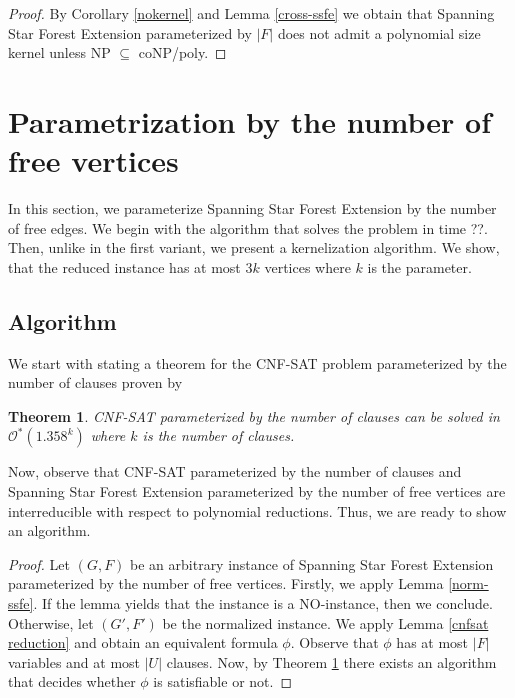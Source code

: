 \documentclass[en]{pracamgr}
\newtheorem{theorem}{Theorem}
\theoremstyle{definition}
\newcommand{\ssfep}{{\sc Spanning Star Forest Extension}}
\newcommand{\cnfsat}{{\sc CNF-SAT}}
\begin{document}
\thmssfepnokernel*

\begin{proof}
	By Corollary \ref{nokernel} and Lemma \ref{cross-ssfe} we obtain that \ssfep{} parameterized by $|F|$ does not admit a polynomial size kernel unless \textup{NP $\subseteq$ coNP/poly}.
\end{proof}

\section{Parametrization by the number of free vertices}

In this section, we parameterize  \ssfep{} by the number of free edges. We begin with the algorithm that solves the problem in time ??.%
Then, unlike in the first variant, we present a kernelization algorithm. We show, that the reduced instance has at most $3k$ vertices where $k$ is the parameter.

\subsection{Algorithm}
We start with stating a theorem for the \cnfsat{} problem parameterized by the number of clauses proven by 

\begin{theorem}\label{cnfsatmtime}
	\cnfsat{} parameterized by the number of clauses can be solved in $\mathcal{O}^*(1.358^k)$ where $k$ is the number of clauses.
\end{theorem}

Now, observe that \cnfsat{} parameterized by the number of clauses and \ssfep{} parameterized by the number of free vertices are interreducible with respect to polynomial reductions. Thus, we are ready to show an algorithm.

\thmssfepfetime*

\begin{proof}
	Let $(G,F)$ be an arbitrary instance of \ssfep{} parameterized by the number of free vertices. Firstly, we apply Lemma \ref{norm-ssfe}. If the lemma yields that the instance is a NO-instance, then we conclude. Otherwise, let $(G',F')$ be the normalized instance. We apply Lemma \ref{cnfsat reduction} and obtain an equivalent formula $\phi$. Observe that $\phi$ has at most $|F|$ variables and at most $|U|$ clauses. Now, by Theorem \ref{cnfsatmtime} there exists an algorithm that decides whether $\phi$ is satisfiable or not.
\end{proof}
\end{document}
